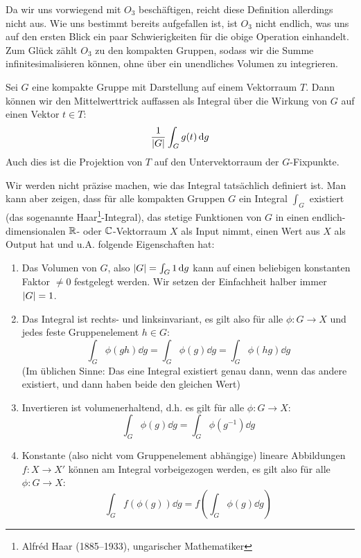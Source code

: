 \begin{remark}
Da wir uns vorwiegend mit $O_3$ beschäftigen, reicht diese Definition allerdings nicht aus. Wie uns bestimmt bereits aufgefallen ist, ist $O_3$ nicht endlich, was uns auf den ersten Blick ein paar Schwierigkeiten für die obige Operation einhandelt. Zum Glück zählt $O_3$ zu den kompakten Gruppen, sodass wir die Summe infinitesimalisieren können, ohne über ein unendliches Volumen zu integrieren.
\end{remark}

\begin{definition}
	Sei $G$ eine kompakte Gruppe mit Darstellung auf einem Vektorraum $T$. Dann können wir den Mittelwerttrick auffassen als Integral über die Wirkung von $G$ auf einen Vektor $t\in T$:
	\[
		\frac{1}{\lvert G\rvert} \int_{G} g(t) \,\textrm{d} g
	\]
	Auch dies ist die Projektion von $T$ auf den Untervektorraum der $G$-Fixpunkte.
	
	\medbreak
	Wir werden nicht präzise machen, wie das Integral tatsächlich definiert ist. Man kann aber zeigen, dass für alle kompakten Gruppen $G$ ein Integral $\int_G$ existiert (das sogenannte Haar\footnote{Alfréd Haar (1885--1933), ungarischer Mathematiker}-Integral), das stetige Funktionen von $G$ in einen endlich-dimensionalen $\mathbb{R}$- oder $\mathbb{C}$-Vektorraum $X$ als Input nimmt, einen Wert aus $X$ als Output hat und u.A. folgende Eigenschaften hat: 
	\begin{enumerate}
		\item Das Volumen von $G$, also $\lvert G\rvert = \int_G 1 \,\textrm{d} g$ kann auf einen beliebigen konstanten Faktor $\neq0$ festgelegt werden. Wir setzen der Einfachheit halber immer $\lvert G\rvert=1$.
		\item Das Integral ist rechts- und linksinvariant, es gilt also für alle $\phi: G\to X$ und jedes feste Gruppenelement $h\in G$:
		\[\int_{G} \phi(gh) \dd g = \int_{G} \phi(g) \dd g  = \int_{G} \phi(hg) \dd g\]
		(Im üblichen Sinne: Das eine Integral existiert genau dann, wenn das andere existiert, und dann haben beide den gleichen Wert)
		\item Invertieren ist volumenerhaltend, d.h. es gilt für alle $\phi: G\to X$:
		\[\int_G \phi(g) \dd g = \int_G \phi(g^{-1}) \dd g\]
		\item Konstante (also nicht vom Gruppenelement abhängige) lineare Abbildungen $f: X\to X'$ können am Integral vorbeigezogen werden, es gilt also für alle $\phi: G\to X$:
		\[\int_G f(\phi(g)) \dd g = f\left(\int_G \phi(g) \dd g\right)\]
	\end{enumerate}
	

\end{definition}

